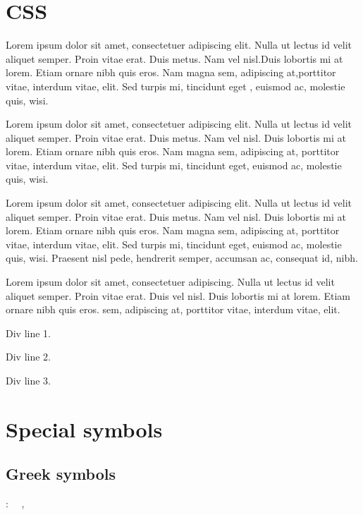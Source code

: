 \documentclass{article}
\begin{document}
\section{CSS}
\par Lorem ipsum dolor sit amet, consectetuer adipiscing elit.
 Nulla ut lectus id velit aliquet semper. Proin vitae erat. Duis metus. Nam
 vel nisl.Duis lobortis mi at lorem. Etiam ornare nibh quis eros. Nam magna 
sem, adipiscing at,porttitor vitae, interdum vitae, elit. Sed turpis mi,
 tincidunt eget , euismod ac, molestie quis, wisi.
  
\par Lorem ipsum dolor sit amet, consectetuer adipiscing elit.
 Nulla ut lectus id velit aliquet semper. Proin vitae erat. Duis metus. Nam
 vel nisl. Duis lobortis mi at lorem. Etiam ornare nibh quis eros. Nam magna 
sem, adipiscing at, porttitor vitae, interdum vitae, elit. Sed turpis mi,
 tincidunt eget, euismod ac, molestie quis, wisi.
  
\par Lorem ipsum dolor sit amet, consectetuer adipiscing elit.
 Nulla ut lectus id velit aliquet semper. Proin vitae erat. Duis metus. Nam
 vel nisl. Duis lobortis mi at lorem. Etiam ornare nibh quis eros. Nam magna 
sem, adipiscing at, porttitor vitae, interdum vitae, elit. Sed turpis mi,
 tincidunt eget, euismod ac, molestie quis, wisi. Praesent nisl pede,
 hendrerit semper, accumsan ac, consequat id, nibh.
\par Lorem ipsum dolor sit amet, consectetuer adipiscing.
 Nulla ut lectus id velit aliquet semper. Proin vitae erat. Duis
 vel nisl. Duis lobortis mi at lorem. Etiam ornare nibh quis eros. 
sem, adipiscing at, porttitor vitae, interdum vitae, elit.
\par Div line 1. 
\par Div line 2. 
\par Div line 3.

\section{Special symbols}
\subsection{Greek symbols}
\par {}: \ \Alpha \  , \ \Gamma \ \ \Theta \ \ \Xi \ \ \Pi \ 
\end{document}
